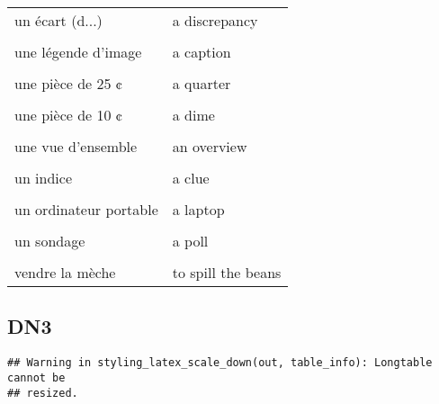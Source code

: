 \documentclass[
  10pt,
]{article}
\begin{document}
\begin{longtable}{ll}
un écart (d...) & a discrepancy\\

\cellcolor{gray!6}{un écart (g...)} & \cellcolor{gray!6}{a gap}\\

une légende d'image & a caption\\

\cellcolor{gray!6}{une mission, une tâche} & \cellcolor{gray!6}{an assignment}\\

une pièce de 25 ¢ & a quarter\\

\cellcolor{gray!6}{une pièce de 5 ¢} & \cellcolor{gray!6}{a nickel}\\

une pièce de 10 ¢ & a dime\\

\cellcolor{gray!6}{une tâche de couleur} & \cellcolor{gray!6}{a patch}\\

une vue d'ensemble & an overview\\

\cellcolor{gray!6}{un hommage} & \cellcolor{gray!6}{a tribute}\\

un indice & a clue\\

\cellcolor{gray!6}{un ordinateur de bureau} & \cellcolor{gray!6}{a desktop}\\

un ordinateur portable & a laptop\\

\cellcolor{gray!6}{un rédacteur en chef} & \cellcolor{gray!6}{an editor}\\

un sondage & a poll\\

\cellcolor{gray!6}{un stage} & \cellcolor{gray!6}{an internship}\\

vendre la mèche & to spill the beans\\
\bottomrule
\end{longtable}

\hypertarget{dn3}{%
\subsection{DN3}\label{dn3}}

\begin{verbatim}
## Warning in styling_latex_scale_down(out, table_info): Longtable cannot be
## resized.
\end{verbatim}
\end{document}
